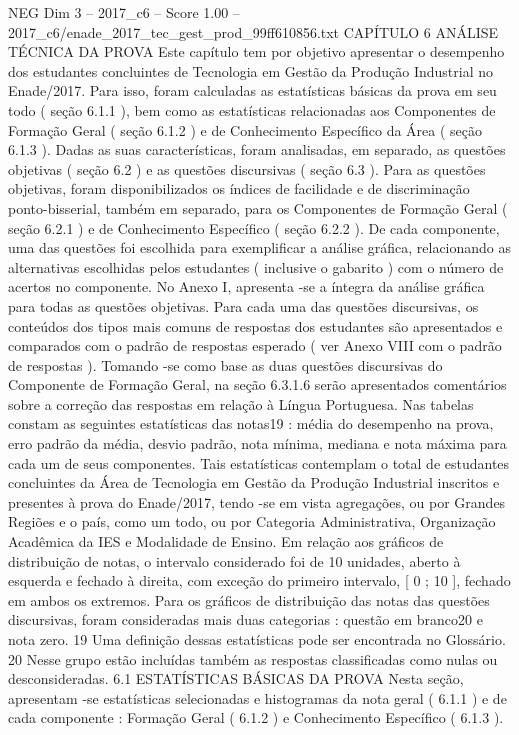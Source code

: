 \begin{textsample}{NEG Dim 3 – 2017\_c6 – Score 1.00 – 2017\_c6/enade\_2017\_tec\_gest\_prod\_99ff610856.txt}  \label{ex:f3_neg_094}
CAPÍTULO 6 ANÁLISE TÉCNICA DA PROVA Este capítulo tem por objetivo apresentar o desempenho dos estudantes concluintes de Tecnologia em Gestão da Produção Industrial no Enade/2017.
Para isso, foram calculadas as estatísticas básicas da prova em seu todo ( seção 6.1.1 ), bem como as estatísticas relacionadas aos Componentes de Formação Geral ( seção 6.1.2 ) e de Conhecimento Específico da Área ( seção 6.1.3 ).
Dadas as suas características, foram analisadas, em separado, as questões objetivas ( seção 6.2 ) e as questões discursivas ( seção 6.3 ).
Para as questões objetivas, foram disponibilizados os índices de facilidade e de discriminação ponto-bisserial, também em separado, para os Componentes de Formação Geral ( seção 6.2.1 ) e de Conhecimento Específico ( seção 6.2.2 ).
De cada componente, uma das questões foi escolhida para exemplificar a análise gráfica, relacionando as alternativas escolhidas pelos estudantes ( inclusive o gabarito ) com o número de acertos no componente.
No Anexo I, apresenta -se a íntegra da análise gráfica para todas as questões objetivas.
Para cada uma das questões discursivas, os conteúdos dos tipos mais comuns de respostas dos estudantes são apresentados e comparados com o padrão de respostas esperado ( ver Anexo VIII com o padrão de respostas ).
Tomando -se como base as duas questões discursivas do Componente de Formação Geral, na seção 6.3.1.6 serão apresentados comentários sobre a correção das respostas em relação à Língua Portuguesa.
Nas tabelas constam as seguintes estatísticas das notas19 : média do desempenho na prova, erro padrão da média, desvio padrão, nota mínima, mediana e nota máxima para cada um de seus componentes.
Tais estatísticas contemplam o total de estudantes concluintes da Área de Tecnologia em Gestão da Produção Industrial inscritos e presentes à prova do Enade/2017, tendo -se em vista agregações, ou por Grandes Regiões e o país, como um todo, ou por Categoria Administrativa, Organização Acadêmica da IES e Modalidade de Ensino.
Em relação aos gráficos de distribuição de notas, o intervalo considerado foi de 10 unidades, aberto à esquerda e fechado à direita, com exceção do primeiro intervalo, [ 0 ; 10 ], fechado em ambos os extremos.
Para os gráficos de distribuição das notas das questões discursivas, foram consideradas mais duas categorias : questão em branco20 e nota zero. 19 Uma definição dessas estatísticas pode ser encontrada no Glossário. 20 Nesse grupo estão incluídas também as respostas classificadas como nulas ou desconsideradas. 6.1 ESTATÍSTICAS BÁSICAS DA PROVA Nesta seção, apresentam -se estatísticas selecionadas e histogramas da nota geral ( 6.1.1 ) e de cada componente : Formação Geral ( 6.1.2 ) e Conhecimento Específico ( 6.1.3 ).

\end{textsample}
